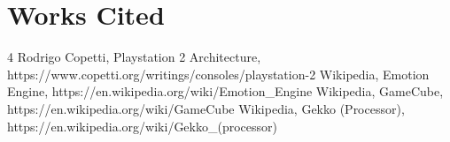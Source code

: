 \documentclass[12pt, letterpaper]{article}
\begin{document}
\part{Works Cited}

\begin{thebibliography}{4}
        Rodrigo Copetti, Playstation 2 Architecture, https://www.copetti.org/writings/consoles/playstation-2
        Wikipedia, Emotion Engine, https://en.wikipedia.org/wiki/Emotion\_Engine
        Wikipedia, GameCube, https://en.wikipedia.org/wiki/GameCube
        Wikipedia, Gekko (Processor), https://en.wikipedia.org/wiki/Gekko\_(processor)

\end{thebibliography}
\end{document}
